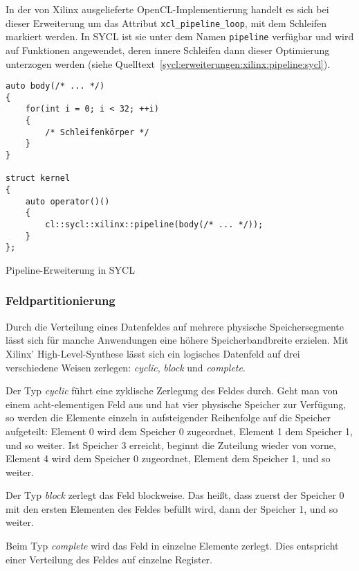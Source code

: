 In der von Xilinx ausgelieferte OpenCL-Implementierung handelt es sich bei
dieser Erweiterung um das Attribut \texttt{xcl\_pipeline\_loop}, mit dem
Schleifen markiert werden. In SYCL ist sie unter dem Namen \texttt{pipeline}
verfügbar und wird auf Funktionen angewendet, deren innere Schleifen dann dieser
Optimierung unterzogen werden (siehe
Quelltext~\ref{sycl:erweiterungen:xilinx:pipeline:sycl}).

\begin{code}
    \begin{verbatim}
auto body(/* ... */)
{
    for(int i = 0; i < 32; ++i)
    {
        /* Schleifenkörper */
    }
}

struct kernel
{
    auto operator()()
    {
        cl::sycl::xilinx::pipeline(body(/* ... */));
    }
};
    \end{verbatim}
    \caption{Pipeline-Erweiterung in SYCL}
    \label{sycl:erweiterungen:xilinx:pipeline:sycl}
\end{code}

\subsubsection{Feldpartitionierung}
\label{sycl:erweiterungen:xilinx:partitioning}

Durch die Verteilung eines Datenfeldes auf mehrere physische Speichersegmente
lässt sich für manche Anwendungen eine höhere Speicherbandbreite erzielen.
Mit Xilinx' High-Level-Synthese lässt sich ein logisches Datenfeld auf drei
verschiedene Weisen zerlegen: \textit{cyclic}, \textit{block} und
\textit{complete}. \cite[vgl.][16]{sdxpragma2019}

Der Typ \textit{cyclic} führt eine zyklische Zerlegung des Feldes durch. Geht
man von einem acht-elementigen Feld aus und hat vier physische Speicher zur
Verfügung, so werden die Elemente einzeln in aufsteigender Reihenfolge auf die
Speicher aufgeteilt: Element 0 wird dem Speicher 0 zugeordnet, Element 1 dem
Speicher 1, und so weiter. Ist Speicher 3 erreicht, beginnt die Zuteilung wieder
von vorne, Element 4 wird dem Speicher 0 zugeordnet, Element dem Speicher 1,
und so weiter. \cite[vgl.][17]{sdxpragma2019}

Der Typ \textit{block} zerlegt das Feld blockweise. Das heißt, dass zuerst der
Speicher 0 mit den ersten Elementen des Feldes befüllt wird, dann der Speicher
1, und so weiter. \cite[vgl.][17]{sdxpragma2019}

Beim Typ \textit{complete} wird das Feld in einzelne Elemente zerlegt. Dies
entspricht einer Verteilung des Feldes auf einzelne Register.
\cite[vgl.][17]{sdxpragma2019}

